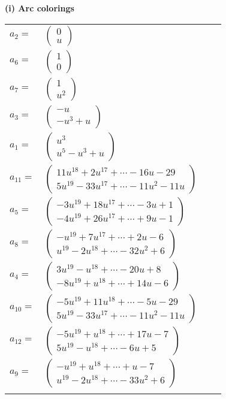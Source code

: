\documentclass[1p]{elsarticle_modified}
\theoremstyle{definition}
\begin{document}
\flushleft \textbf{(i) Arc colorings}\\
\begin{tabular}{m{7pt} m{180pt} m{7pt} m{180pt} }
\flushright $a_{2}=$&$\begin{pmatrix}0\\u\end{pmatrix}$ \\
\flushright $a_{6}=$&$\begin{pmatrix}1\\0\end{pmatrix}$ \\
\flushright $a_{7}=$&$\begin{pmatrix}1\\u^2\end{pmatrix}$ \\
\flushright $a_{3}=$&$\begin{pmatrix}- u\\- u^3+u\end{pmatrix}$ \\
\flushright $a_{1}=$&$\begin{pmatrix}u^3\\u^5- u^3+u\end{pmatrix}$ \\
\flushright $a_{11}=$&$\begin{pmatrix}11 u^{18}+2 u^{17}+\cdots-16 u-29\\5 u^{19}-33 u^{17}+\cdots-11 u^2-11 u\end{pmatrix}$ \\
\flushright $a_{5}=$&$\begin{pmatrix}-3 u^{19}+18 u^{17}+\cdots-3 u+1\\-4 u^{19}+26 u^{17}+\cdots+9 u-1\end{pmatrix}$ \\
\flushright $a_{8}=$&$\begin{pmatrix}- u^{19}+7 u^{17}+\cdots+2 u-6\\u^{19}-2 u^{18}+\cdots-32 u^2+6\end{pmatrix}$ \\
\flushright $a_{4}=$&$\begin{pmatrix}3 u^{19}- u^{18}+\cdots-20 u+8\\-8 u^{19}+u^{18}+\cdots+14 u-6\end{pmatrix}$ \\
\flushright $a_{10}=$&$\begin{pmatrix}-5 u^{19}+11 u^{18}+\cdots-5 u-29\\5 u^{19}-33 u^{17}+\cdots-11 u^2-11 u\end{pmatrix}$ \\
\flushright $a_{12}=$&$\begin{pmatrix}-5 u^{19}+u^{18}+\cdots+17 u-7\\5 u^{19}- u^{18}+\cdots-6 u+5\end{pmatrix}$ \\
\flushright $a_{9}=$&$\begin{pmatrix}- u^{19}+u^{18}+\cdots+u-7\\u^{19}-2 u^{18}+\cdots-33 u^2+6\end{pmatrix}$\\&\end{tabular}
\end{document}
